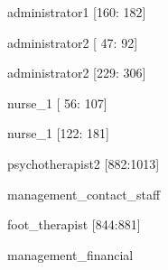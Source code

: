 \documentclass[12pt,a4paper,oneside]{article}
\begin{document}
\begin{itemize}
{ \item administrator1 [160: 182] }%
{ \item administrator2 [ 47:  92] }%
{ \item administrator2 [229: 306] }%
{ \item nurse\_1 [ 56: 107] }%
{ \item nurse\_1 [122: 181] }%
{ \item psychotherapist2 [882:1013] }%
\end{itemize}
{management\_contact\_staff}
\begin{itemize}
{ \item foot\_therapist [844:881] }%
\end{itemize}
{management\_financial}%
\end{document}
